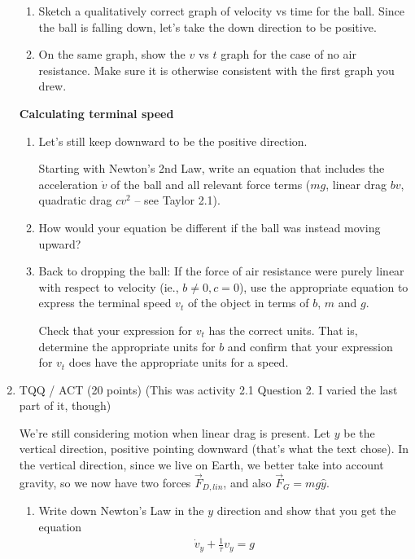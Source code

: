\documentclass[12pt]{article}
\begin{document}
\begin{enumerate}
\begin{enumerate}
          \item Sketch a qualitatively correct graph of velocity vs time for the ball. Since the ball is falling down, let's take the down direction to be positive.

          \item
                On the same graph, show the $v$ vs $t$ graph for the case of no air resistance. Make sure it is otherwise consistent with the first graph you drew.

        \end{enumerate}

        \textbf{Calculating terminal speed}

        \begin{enumerate}[resume]
          \item Let's still keep downward to be the positive direction.

                Starting with Newton's 2nd Law, write an equation that includes the acceleration $\dot v$ of the ball and all relevant force terms ($mg$, linear drag $bv$, quadratic drag $cv^2$ -- see Taylor 2.1).

          \item How would your equation be different if the ball was instead moving upward?

          \item Back to dropping the ball: If the force of air resistance were purely linear with respect to velocity (ie., $b \ne 0, c = 0$), use the appropriate equation to express the terminal speed $v_t$ of the object in terms of $b$, $m$ and $g$.

                Check that your expression for $v_t$ has the correct units. That is, determine the appropriate units for $b$ and confirm that your expression for $v_t$ does have the appropriate units for a speed.
        \end{enumerate}

  \item TQQ / ACT (20 points) (This was activity 2.1 Question 2. I varied the last part of it, though)

        We're still considering motion when linear drag is present. Let $y$ be the vertical direction, positive pointing downward (that's what the text chose). In the vertical direction, since we live on Earth, we better take into account gravity, so we now have two forces $\vec F_{D,lin}$, and also $\vec F_G = mg \hat y$.

        \begin{enumerate}
          \item Write down Newton's Law in the $y$ direction and show that you get the equation
                \begin{align}
                  \dot v_y + \frac{1}{\tau} v_y = g
                \end{align}


\end{enumerate}
\end{enumerate}
\end{document}
